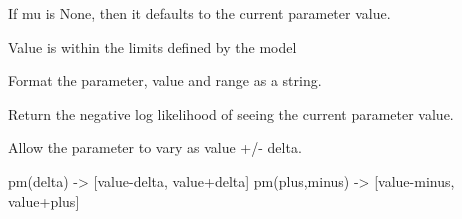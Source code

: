 \documentclass[letterpaper,10pt,english]{sphinxmanual}
\begin{document}
\begin{fulllineitems}
\begin{fulllineitems}
If mu is None, then it defaults to the current parameter value.

\end{fulllineitems}


\begin{fulllineitems}
\label{api/mystic.parameter:refl1d.mystic.parameter.Reference.feasible}
Value is within the limits defined by the model

\end{fulllineitems}


\begin{fulllineitems}
\label{api/mystic.parameter:refl1d.mystic.parameter.Reference.format}
Format the parameter, value and range as a string.

\end{fulllineitems}


\begin{fulllineitems}
\label{api/mystic.parameter:refl1d.mystic.parameter.Reference.nllf}
Return the negative log likelihood of seeing the current parameter value.

\end{fulllineitems}


\begin{fulllineitems}
\label{api/mystic.parameter:refl1d.mystic.parameter.Reference.parameters}
\end{fulllineitems}


\begin{fulllineitems}
\label{api/mystic.parameter:refl1d.mystic.parameter.Reference.pm}
Allow the parameter to vary as value +/- delta.

pm(delta) -\textgreater{} {[}value-delta, value+delta{]}
pm(plus,minus) -\textgreater{} {[}value-minus, value+plus{]}


\end{fulllineitems}
\end{fulllineitems}
\end{document}
